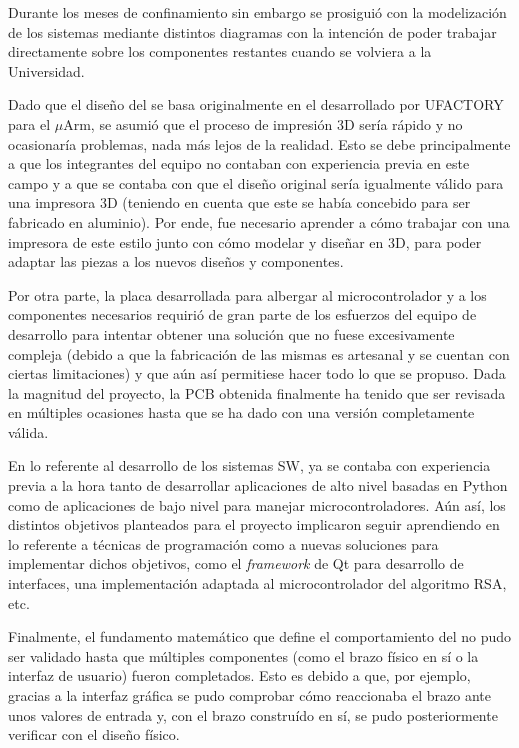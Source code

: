 Durante los meses de confinamiento sin embargo se prosiguió con la modelización
de los sistemas mediante distintos diagramas con la intención de poder trabajar
directamente sobre los componentes restantes cuando se volviera a la Universidad.

Dado que el diseño del \pArm{} se basa originalmente en el desarrollado por UFACTORY
para el $\mu$Arm, se asumió que el proceso de impresión 3D sería rápido y no
ocasionaría problemas, nada más lejos de la realidad. Esto se debe principalmente
a que los integrantes del equipo no contaban con experiencia previa en este campo y
a que se contaba con que el diseño original sería igualmente válido para una impresora
3D (teniendo en cuenta que este se había concebido para ser fabricado en aluminio).
Por ende, fue necesario aprender a cómo trabajar con una impresora de este estilo
junto con cómo modelar y diseñar en 3D, para poder adaptar las piezas a los nuevos
diseños y componentes.

Por otra parte, la placa desarrollada para albergar al microcontrolador y a los
componentes necesarios requirió de gran parte de los esfuerzos del equipo de
desarrollo para intentar obtener una solución que no fuese excesivamente compleja
(debido a que la fabricación de las mismas es artesanal y se cuentan con ciertas
limitaciones) y que aún así permitiese hacer todo lo que se propuso. Dada la magnitud
del proyecto, la \ac{PCB} obtenida finalmente ha tenido que ser revisada en múltiples
ocasiones hasta que se ha dado con una versión completamente válida.

En lo referente al desarrollo de los sistemas \ac{SW}, ya se contaba con experiencia
previa a la hora tanto de desarrollar aplicaciones de alto nivel basadas en Python
como de aplicaciones de bajo nivel para manejar microcontroladores. Aún así, los distintos
objetivos planteados para el proyecto implicaron seguir aprendiendo en lo referente a
técnicas de programación como a nuevas soluciones para implementar dichos objetivos,
como el \textit{framework} de Qt para desarrollo de interfaces, una implementación
adaptada al microcontrolador del algoritmo RSA, etc.

Finalmente, el fundamento matemático que define el comportamiento del \pArm{} no pudo
ser validado hasta que múltiples componentes (como el brazo físico en sí o la
interfaz de usuario) fueron completados. Esto es debido a que, por ejemplo,
gracias a la interfaz gráfica se pudo comprobar cómo reaccionaba el brazo ante
unos valores de entrada y, con el brazo construído en sí, se pudo posteriormente
verificar con el diseño físico.

